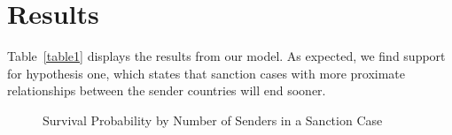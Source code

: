 \section{Results}
\label{Results} 

Table~\ref{table1} displays the results from our model. As expected, we find support for hypothesis one, which states that sanction cases with more proximate relationships between the sender countries will end sooner. 



\begin{figure}[ht]
	\centering
	\caption{Survival Probability by Number of Senders in a Sanction Case}
	\resizebox{1\textwidth}{!}{}
\end{figure}

\begin{figure}[ht]
	\centering
	\resizebox{1\textwidth}{!}{}	
\end{figure}

\begin{figure}[ht]
	\centering
	\resizebox{1\textwidth}{!}{}	
\end{figure}

